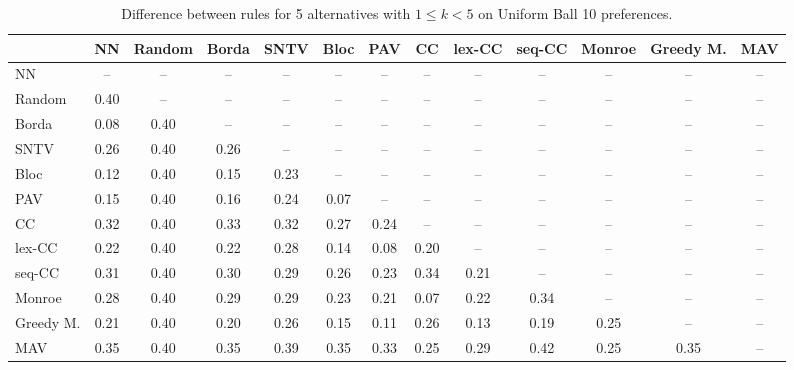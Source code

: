 
\begin{table*}[h!]
\centering
\begin{tabular}{lcccccccccccc}
\toprule
 & NN & Random & Borda & SNTV & Bloc & PAV & CC & lex-CC & seq-CC & Monroe & Greedy M. & MAV \\
\midrule
NN & -- & -- & -- & -- & -- & -- & -- & -- & -- & -- & -- & -- \\
Random & 0.40 & -- & -- & -- & -- & -- & -- & -- & -- & -- & -- & -- \\
Borda & 0.08 & 0.40 & -- & -- & -- & -- & -- & -- & -- & -- & -- & -- \\
SNTV & 0.26 & 0.40 & 0.26 & -- & -- & -- & -- & -- & -- & -- & -- & -- \\
Bloc & 0.12 & 0.40 & 0.15 & 0.23 & -- & -- & -- & -- & -- & -- & -- & -- \\
PAV & 0.15 & 0.40 & 0.16 & 0.24 & 0.07 & -- & -- & -- & -- & -- & -- & -- \\
CC & 0.32 & 0.40 & 0.33 & 0.32 & 0.27 & 0.24 & -- & -- & -- & -- & -- & -- \\
lex-CC & 0.22 & 0.40 & 0.22 & 0.28 & 0.14 & 0.08 & 0.20 & -- & -- & -- & -- & -- \\
seq-CC & 0.31 & 0.40 & 0.30 & 0.29 & 0.26 & 0.23 & 0.34 & 0.21 & -- & -- & -- & -- \\
Monroe & 0.28 & 0.40 & 0.29 & 0.29 & 0.23 & 0.21 & 0.07 & 0.22 & 0.34 & -- & -- & -- \\
Greedy M. & 0.21 & 0.40 & 0.20 & 0.26 & 0.15 & 0.11 & 0.26 & 0.13 & 0.19 & 0.25 & -- & -- \\
MAV & 0.35 & 0.40 & 0.35 & 0.39 & 0.35 & 0.33 & 0.25 & 0.29 & 0.42 & 0.25 & 0.35 & -- \\
\bottomrule
\end{tabular}

\caption{Difference between rules for 5 alternatives with $1 \leq k < 5$ on Uniform Ball 10 preferences.}
\end{table*}
